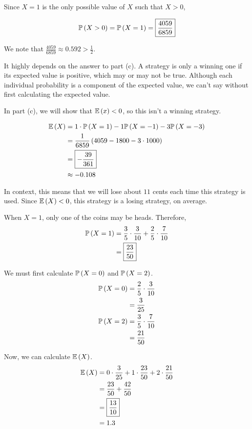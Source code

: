 \documentclass{article}
\begin{document}
Since $X = 1$ is the only possible value of $X$ such that $X > 0$,

$$
\mathbb{P} \left ( X > 0 \right) = \mathbb{P} \left ( X = 1 \right) = \boxed{\frac{4059}{6859}}
$$

We note that $\frac{4059}{6859} \approx 0.592 > \frac{1}{2}$.


\subproblema{}
It highly depends on the answer to part (c).
A strategy is only a winning one if its expected value is positive, which may or may not be true.
Although each individual probability is a component of the expected value, we can't say without first calculating the expected value.

In part (c), we will show that $\mathbb{E} \left ( x \right) < 0$, so this isn't a winning strategy.

\subproblema{}

\begin{align*}
  \mathbb{E} \left ( X \right) &= 1 \cdot \mathbb{P} \left ( X = 1 \right) - 1 \mathbb{P} \left ( X = -1 \right) - 3 \mathbb{P} \left ( X = -3 \right) \\
         &= \frac{1}{6859} \left (4059 - 1800 - 3 \cdot 1000 \right) \\
         &= \boxed{- \frac{39}{361}} \\
         & \approx - 0.108
\end{align*}

In context, this means that we will lose about $11$ cents each time this strategy is used.
Since $\mathbb{E} \left ( X \right) < 0$, this strategy is a losing strategy, on average.

\setcounter{problem}{24}
\problem{}
\subproblema{}
When $X=1$, only one of the coins may be heads.
Therefore,
\begin{align*}
  \mathbb{P} \left ( X = 1 \right) &= \frac{3}{5} \cdot \frac{3}{10} + \frac{2}{5} \cdot \frac{7}{10} \\
             &= \boxed{\frac{23}{50}} \\
\end{align*}

\subproblema{}
We must first calculate $\mathbb{P} \left ( X = 0 \right)$ and $\mathbb{P} \left ( X = 2 \right)$.
\begin{align*}
  \mathbb{P} \left ( X = 0 \right) &= \frac{2}{5} \cdot \frac{3}{10} \\
             &= \frac{3}{25} \\
  \mathbb{P} \left ( X = 2 \right) &= \frac{3}{5} \cdot \frac{7}{10} \\
             &= \frac{21}{50} \\
\end{align*}

Now, we can calculate $\mathbb{E} \left ( X \right)$.
\begin{align*}
  \mathbb{E} \left ( X \right) &= 0 \cdot \frac{3}{25} + 1 \cdot \frac{23}{50} + 2 \cdot \frac{21}{50} \\
         &= \frac{23}{50} + \frac{42}{50} \\
         &= \boxed{\frac{13}{10}} \\
         &= 1.3 \\
\end{align*}
\end{document}
